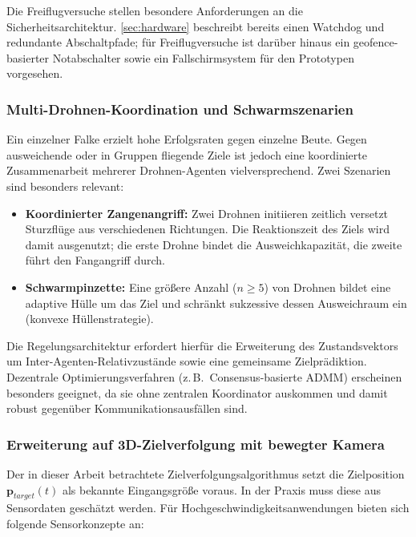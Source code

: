 ﻿\documentclass[12pt,a4paper]{article}
\theoremstyle{remark}
\begin{document}
	Die Freiflugversuche stellen besondere Anforderungen an die Sicherheitsarchitektur. \cref{sec:hardware} beschreibt bereits einen Watchdog und redundante Abschaltpfade; für Freiflugversuche ist darüber hinaus ein geofence-basierter Notabschalter sowie ein Fallschirmsystem für den Prototypen vorgesehen.

	\subsubsection{Multi-Drohnen-Koordination und Schwarmszenarien}

	Ein einzelner Falke erzielt hohe Erfolgsraten gegen einzelne Beute. Gegen ausweichende oder in Gruppen fliegende Ziele ist jedoch eine koordinierte Zusammenarbeit mehrerer Drohnen-Agenten vielversprechend. Zwei Szenarien sind besonders relevant:

	\begin{itemize}
		\item \textbf{Koordinierter Zangenangriff:} Zwei Drohnen initiieren zeitlich versetzt Sturzflüge aus verschiedenen Richtungen. Die Reaktionszeit des Ziels wird damit ausgenutzt; die erste Drohne bindet die Ausweichkapazität, die zweite führt den Fangangriff durch.
		\item \textbf{Schwarmpinzette:} Eine größere Anzahl ($n \geq 5$) von Drohnen bildet eine adaptive Hülle um das Ziel und schränkt sukzessive dessen Ausweichraum ein (konvexe Hüllenstrategie).
	\end{itemize}

	Die Regelungsarchitektur erfordert hierfür die Erweiterung des Zustandsvektors um Inter-Agenten-Relativzustände sowie eine gemeinsame Zielprädiktion. Dezentrale Optimierungsverfahren (z.\,B.\ Consensus-basierte ADMM) erscheinen besonders geeignet, da sie ohne zentralen Koordinator auskommen und damit robust gegenüber Kommunikationsausfällen sind.

	\subsubsection{Erweiterung auf 3D-Zielverfolgung mit bewegter Kamera}

	Der in dieser Arbeit betrachtete Zielverfolgungsalgorithmus setzt die Zielposition $\mathbf{p}_{target}(t)$ als bekannte Eingangsgröße voraus. In der Praxis muss diese aus Sensordaten geschätzt werden. Für Hochgeschwindigkeitsanwendungen bieten sich folgende Sensorkonzepte an:
\end{document}
